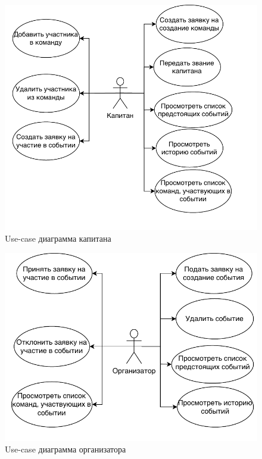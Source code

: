 \begin{figure}[H]
	\begin{center}
		\includegraphics[page=1,scale=1]{assets/use-case-captain.drawio.pdf}
	\end{center}
	\caption{Use-case диаграмма капитана}
	\label{use-case}
\end{figure}

\begin{figure}[H]
	\begin{center}
		\includegraphics[page=1,scale=1]{assets/use-case-org.drawio.pdf}
	\end{center}
	\caption{Use-case диаграмма организатора}
	\label{use-case}
\end{figure}

